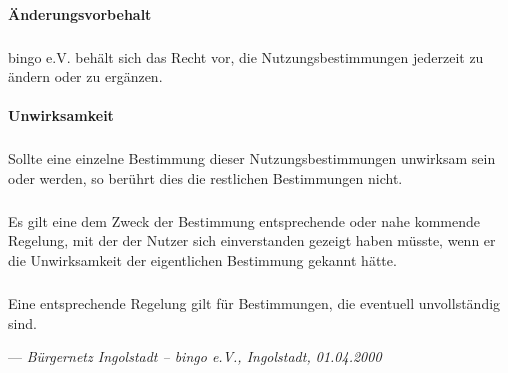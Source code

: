 \begin{multicols}{2}
\paragraph{Änderungsvorbehalt}
\subparagraph{} bingo e.V. behält sich das Recht vor, die Nutzungsbestimmungen jederzeit zu
ändern oder zu ergänzen.

\paragraph{Unwirksamkeit}
\subparagraph{} Sollte eine einzelne Bestimmung dieser Nutzungsbestimmungen unwirksam
sein oder werden, so berührt dies die restlichen Bestimmungen nicht.
\subparagraph{} Es gilt eine dem Zweck der Bestimmung entsprechende oder nahe
kommende Regelung, mit der der Nutzer sich einverstanden gezeigt haben
müsste, wenn er die Unwirksamkeit der eigentlichen Bestimmung gekannt
hätte.
\subparagraph{} Eine entsprechende Regelung gilt für Bestimmungen, die eventuell
unvollständig sind.

\end{multicols}

\vfill
--- \emph{Bürgernetz Ingolstadt -- bingo e.V., Ingolstadt, 01.04.2000}
